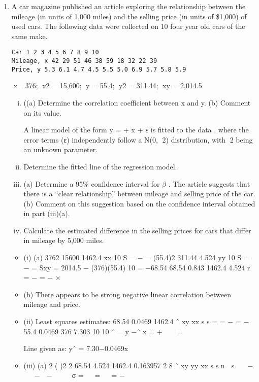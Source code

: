 \documentclass[a4paper,12pt]{article}
\begin{document}
\begin{enumerate}

\item A car magazine published an article exploring the relationship between the mileage
(in units of 1,000 miles) and the selling price (in units of \$1,000) of used cars. The
following data were collected on 10 four year old cars of the same make.
\begin{verbatim}
Car 1 2 3 4 5 6 7 8 9 10
Mileage, x 42 29 51 46 38 59 18 32 22 39
Price, y 5.3 6.1 4.7 4.5 5.5 5.0 6.9 5.7 5.8 5.9
\end{verbatim}
x= 376; x2 = 15,600; y = 55.4; y2 = 311.44; xy = 2,014.5
\begin{enumerate}[(i)]
\item ((a) Determine the correlation coefficient between x and y.
(b) Comment on its value.

A linear model of the form y = \alpha  + \beta x + ε is fitted to the data , where the error terms (ε) independently follow a N(0, 2) distribution, with 2 being an unknown
parameter.
\item  Determine the fitted line of the regression model. 
\item (a) Determine a 95\% confidence interval for $\beta$ .
The article suggests that there is a “clear relationship” between mileage and
selling price of the car.
(b) Comment on this suggestion based on the confidence interval obtained in part (iii)(a).
\item Calculate the estimated difference in the selling prices for cars that differ in
mileage by 5,000 miles. 
\end{enumerate}



\begin{itemize}
\item (i) (a)
3762 15600 1462.4
xx 10 S = − =
  (55.4)2 311.44 4.524
yy 10 S = − =
  Sxy = 2014.5 − (376)(55.4)
10
= −68.54 
68.54 0.843
1462.4 4.524
r = − = −
×

\item (b) There appears to be strong negative linear correlation between mileage and price. 
\item (ii) Least squares estimates:
  68.54 0.0469
1462.4
ˆ xy
xx
s
s
\beta  = = − = −
55.4 0.0469 376 7.303
10 10
\alpha ˆ = y −\beta ˆ x = +   =
   

Line given as: yˆ = 7.30−0.0469x 
\item (iii) (a)
2 ( )2
2
68.54
4.524
1462.4
0.163957
2 8
ˆ
xy
yy
xx
s
s
n
 s   −   −  −    
σ =   =   =
  −


\end{itemize}
\end{enumerate}
\end{document}
